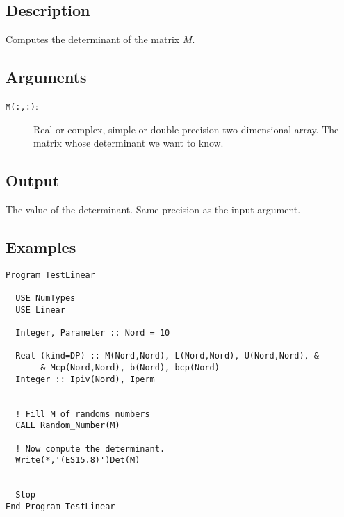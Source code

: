 \subsection{Description}

Computes the determinant of the matrix $M$.

\subsection{Arguments}

\begin{description}
\item[\texttt{M(:,:)}: ] Real or complex, simple or double precision
  two dimensional array. The matrix whose determinant we want to know.
\end{description}

\subsection{Output}

The value of the determinant. Same precision as the input argument.

\subsection{Examples}

\begin{lstlisting}[emph=Det,
                   emphstyle=\color{blue},
                   frame=trBL,
                   caption=Computing the determinant of a matrix.,
                   label=det]
Program TestLinear

  USE NumTypes
  USE Linear

  Integer, Parameter :: Nord = 10

  Real (kind=DP) :: M(Nord,Nord), L(Nord,Nord), U(Nord,Nord), &
       & Mcp(Nord,Nord), b(Nord), bcp(Nord)
  Integer :: Ipiv(Nord), Iperm


  ! Fill M of randoms numbers
  CALL Random_Number(M)

  ! Now compute the determinant.
  Write(*,'(ES15.8)')Det(M)


  Stop
End Program TestLinear
\end{lstlisting}


